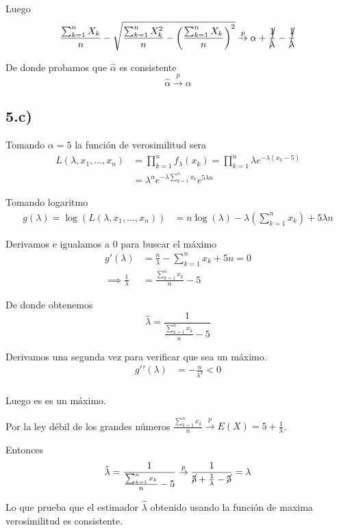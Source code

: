 \documentclass[a4paper,10pt]{article}
\begin{document}
Luego 
\[
\frac{\sum_{k=1}^n X_k}{n} - \sqrt{\frac{\sum_{k=1}^n X_k^2}{n}  - \left(\frac{\sum_{k=1}^n X_k}{n}\right)^2}
\overset{p}{\rightarrow} \alpha + \cancel{\frac{1}{\lambda}} - \cancel{\frac{1}{\lambda}}
\]

De donde probamos que $\hat\alpha$ es consistente
\[
\hat\alpha \overset{p}{\rightarrow} \alpha
\]

\subsection*{5.c)}

Tomando $\alpha = 5$ la función de verosimilitud sera
\[
\begin{align*}
L(\lambda, x_1, \dots, x_n) &= \prod_{k=1}^n f_{\lambda}(x_k) 
= \prod_{k=1}^n \lambda e^{-\lambda(x_k-5)} \\
&= \lambda^n e^{-\lambda\sum_{k=1}^n x_k} e^{5\lambda n}
\end{align*}
\]

Tomando logaritmo
\[
\begin{align*}
g(\lambda) = \log(L(\lambda, x_1, \dots, x_n)) &= n \log(\lambda) - \lambda(\sum_{k=1}^n x_k) + 5\lambda n
\end{align*}
\]

Derivamos e igualamos a 0 para buscar el máximo
\[
\begin{align*}
g\prime(\lambda) &= \frac{n}{\lambda} - \sum_{k=1}^n x_k + 5 n = 0 \\
\implies \frac{1}{\lambda} &= \frac{\sum_{k=1}^n x_k}{n} - 5
\end{align*}
\]

De donde obtenemos
\[
\hat\lambda = \frac{1}{\frac{\sum_{k=1}^n x_k}{n} - 5}
\]

Derivamos una segunda vez para verificar que sea un máximo.
\[
\begin{align*}
g\prime\prime(\lambda) &= -\frac{n}{\lambda^2} < 0 \\
\end{align*}
\]

Luego es es un máximo.

Por la ley débil de los grandes números $\frac{\sum_{k=1}^n x_k}{n} 
\overset{p}{\rightarrow} E(X) = 5 + \frac{1}{\lambda}$.

Entonces
\[
\hat\lambda = \frac{1}{\frac{\sum_{k=1}^n x_k}{n} - 5} 
\overset{p}{\rightarrow} \frac{1}{\cancel{5} + \frac{1}{\lambda} - \cancel{5}} = \lambda
\]

Lo que prueba que el estimador $\hat\lambda$ obtenido usando la
función de maxima verosimilitud es consistente.
\end{document}

